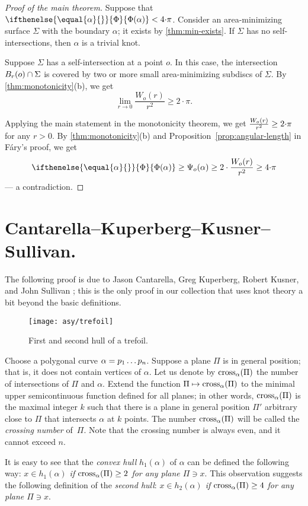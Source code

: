 \documentclass{article}
\newcommand*{\z}[1]{#1\nobreak\discretionary{}%
            {\hbox{$\mathsurround=0pt #1$}}{}}
\theoremstyle{theorem}
\newtheorem{Crofton-type formula}[theorem]{Crofton-type formula}
\newtheorem{Douglas--Rado theorem}[theorem]{Douglas--Rado theorem}
\newtheorem{Extended monotonicity theorem}[theorem]{Extended monotonicity theorem}
\theoremstyle{definition}
\def\cross{\mathop{\rm cross}\nolimits}
\newcommand*{\tc}[1]{\ifthenelse{\equal{#1}{}}{\Phi}{\Phi({#1})}}%
\begin{document}
\begin{proof}[Proof of the main theorem]
Suppose that $\tc\alpha<4{\cdot}\pi$.
Consider an area-minimizing surface $\Sigma$ with the boundary $\alpha$; it exists by \ref{thm:min-exists}.
If $\Sigma$ has no self-intersections, then $\alpha$ is a trivial knot.

Suppose $\Sigma$ has a self-intersection at a point $o$.
In this case, the intersection $B_r(o)\z\cap \Sigma$ is covered by two or more small area-minimizing subdiscs of $\Sigma$.
By \ref{thm:monotonicity}(b), we get 
\[\lim_{r\to0}\frac{W_o(r)}{r^2}\ge 2{\cdot}\pi.\]

Applying the main statement in the monotonicity theorem, we get $\frac{W_o(r)}{r^2}\z\ge 2{\cdot}\pi$ for any $r>0$.
By \ref{thm:monotonicity}(b) and Proposition~\ref{prop:angular-length} in Fáry's proof, we get
\[\tc{\alpha}\ge \Psi_o(\alpha)\ge 2\cdot \frac{W_o(r)}{r^2}\ge 4{\cdot}\pi\]
--- a contradiction.
\end{proof}


\section{Cantarella--Kuperberg--Kusner--Sullivan.}\label{sec:2nd-hull}

The following proof is due to Jason Cantarella, Greg Kuperberg, Robert Kusner, and John Sullivan \cite{CKKS};
this is the only proof in our collection that uses knot theory a bit beyond the basic definitions.

\begin{figure}[!ht]
\vskip-0mm
\centering
\texttt{[image: asy/trefoil]}
\caption{First and second hull of a trefoil.}
\vskip0mm
\end{figure}

Choose a polygonal curve $\alpha\z=p_1\dots p_n$.
Suppose a plane $\Pi$ is in general position; that is, it does not contain vertices of $\alpha$.
Let us denote by $\cross_\alpha(\Pi)$ the number of intersections of $\Pi$ and $\alpha$.
Extend the function $\Pi\z\mapsto \cross_\alpha(\Pi)$ to the minimal upper semicontinuous function defined for all planes;
in other words, $\cross_\alpha(\Pi)$ is the maximal integer $k$ such that there is a plane in general position $\Pi'$ arbitrary close to $\Pi$ that intersects $\alpha$ at $k$ points.
The number $\cross_\alpha(\Pi)$ will be called the \emph{crossing number} of~$\Pi$.
Note that the crossing number is always even, and it cannot exceed $n$.

It is easy to see that the \emph{convex hull} $h_1(\alpha)$ of $\alpha$ can be defined the following way:
\textit{$x\in h_1(\alpha)$ if $\cross_\alpha(\Pi)\z\ge2$ for any plane $\Pi\ni x$}.
This observation suggests the following definition of the \emph{second hull}:
\textit{$x\in h_2(\alpha)$ if $\cross_\alpha(\Pi)\ge4$ for any plane $\Pi\ni x$}.
\end{document}
